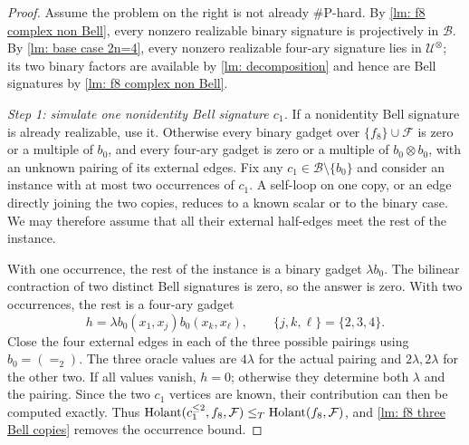 \begin{proof}
Assume the problem on the right is not already \#P-hard.  By
\cref{lm: f8 complex non Bell}, every nonzero realizable binary signature
is projectively in $\mathcal B$.  By \cref{lm: base case 2n=4}, every
nonzero realizable four-ary signature lies in
$\mathcal U^{\otimes}$; its two binary factors are available by
\cref{lm: decomposition} and hence are Bell signatures by
\cref{lm: f8 complex non Bell}.

\emph{Step 1: simulate one nonidentity Bell signature $c_1$.}
If a nonidentity Bell signature is already realizable, use it.  Otherwise
every binary gadget over $\{f_8\}\cup\mathcal F$ is zero or a multiple of
$b_0$, and every four-ary gadget is zero or a multiple of
$b_0\otimes b_0$, with an unknown pairing of its external edges.  Fix any
$c_1\in\mathcal B\setminus\{b_0\}$ and consider an instance with at most
two occurrences of $c_1$.  A self-loop on one copy, or an edge directly
joining the two copies, reduces to a known scalar or to the binary case.
We may therefore assume that all their external half-edges meet the rest
of the instance.

With one occurrence, the rest of the instance is a binary gadget
$\lambda b_0$.  The bilinear contraction of two distinct Bell signatures
is zero, so the answer is zero.  With two occurrences, the rest is a
four-ary gadget
\begin{equation}
 h=\lambda b_0(x_1,x_j)b_0(x_k,x_\ell),
 \qquad \{j,k,\ell\}=\{2,3,4\}.
 \label{eq: unknown equality pairing}
\end{equation}
Close the four external edges in each of the three possible pairings using
$b_0=(=_2)$.  The three oracle values are $4\lambda$ for the actual
pairing and $2\lambda,2\lambda$ for the other two.  If all values vanish,
$h=0$; otherwise they determine both $\lambda$ and the pairing.  Since the
two $c_1$ vertices are known, their contribution can then be computed
exactly.  Thus
$\operatorname{Holant}(c_1^{\leq2},f_8,\mathcal F)\leq_T
  \operatorname{Holant}(f_8,\mathcal F)$, and
\cref{lm: f8 three Bell copies} removes the occurrence bound.


\end{proof}
